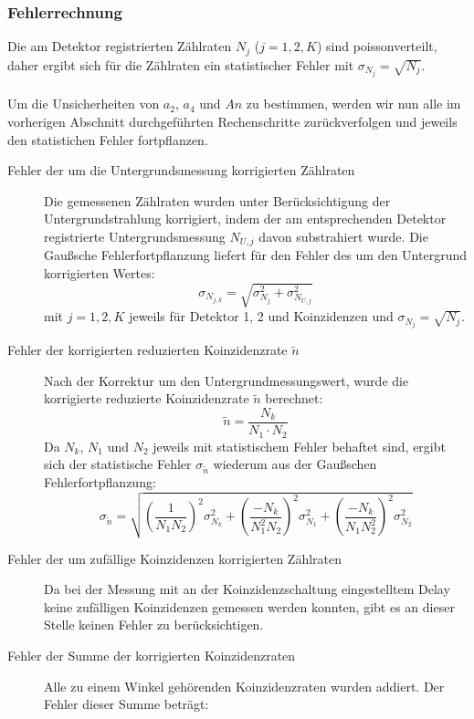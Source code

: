 \documentclass[a4paper,titlepage]{scrartcl}
\numberwithin{equation}{section}
\begin{document}
\subsubsection{Fehlerrechnung}
Die am Detektor registrierten Zählraten $N_j$ ($j = 1,2,K$) sind poissonverteilt, daher ergibt sich für die Zählraten ein statistischer Fehler mit $\sigma_{N_j}=\sqrt{N_j}$. \\ \\
Um die Unsicherheiten von $a_2$, $a_4$ und $An$ zu bestimmen, werden wir nun alle im vorherigen Abschnitt durchgeführten Rechenschritte zurückverfolgen und jeweils den statistichen Fehler fortpflanzen.
\begin{description}
\item[Fehler der um die Untergrundsmessung korrigierten Zählraten] Die gemessenen Zählraten wurden unter Berücksichtigung der Untergrundstrahlung korrigiert, indem der am entsprechenden Detektor registrierte Untergrundsmessung $N_{U,j}$ davon substrahiert wurde. Die Gaußsche Fehlerfortpflanzung liefert für den Fehler des um den Untergrund korrigierten Wertes:
\begin{equation*}
\sigma_{N_{j,k}}=\sqrt{\sigma^2_{N_j}+\sigma^2_{N_{U,j}}}
\end{equation*}
mit $j=1,2,K$ jeweils für Detektor 1, 2 und Koinzidenzen und $\sigma_{N_j}=\sqrt{N_j}$.
\item[Fehler der korrigierten reduzierten Koinzidenzrate $\tilde{n}$] Nach der Korrektur um den Untergrundmessungswert, wurde die korrigierte reduzierte Koinzidenzrate $\tilde{n}$ berechnet:
\begin{equation*}
\tilde{n}=\frac{N_k}{N_1 \cdot N_2}
\end{equation*}
Da $N_k$, $N_1$ und $N_2$ jeweils mit statistischem Fehler behaftet sind, ergibt sich der statistische Fehler $\sigma_{\tilde{n}}$ wiederum aus der Gaußschen Fehlerfortpflanzung:
\begin{equation*}
\sigma_{\tilde{n}}=\sqrt{\left(\frac{1}{N_1 N_2}\right)^2 \sigma^2_{N_k}+\left(\frac{-N_k}{N_1^2 N_2}\right)^2 \sigma_{N_1}^2+\left(\frac{-N_k}{N_1 N_2^2}\right)^2 \sigma_{N_2}^2}
\end{equation*}
\item[Fehler der um zufällige Koinzidenzen korrigierten Zählraten] Da bei der Messung mit an der Koinzidenzschaltung eingestelltem Delay keine zufälligen Koinzidenzen gemessen werden konnten, gibt es an dieser Stelle keinen Fehler zu berücksichtigen.
\item[Fehler der Summe der korrigierten Koinzidenzraten] Alle zu einem Winkel gehörenden Koinzidenzraten wurden addiert. Der Fehler dieser Summe beträgt:

\end{description}
\end{document}
